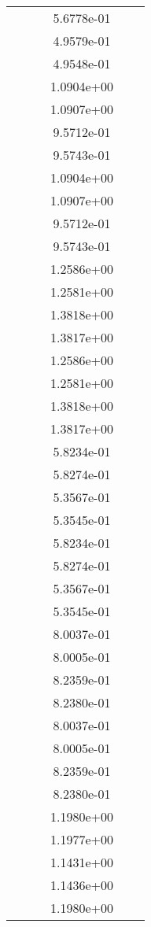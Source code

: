 \begin{xltabular}{\textwidth}{r|rS[table-format=1.3e+2]S[table-format=1.4e+2]S[table-format=1.4e+2]S[table-format=-1.5]}
&  &  & 5.6778e-01 & & \\
&  &  & 4.9579e-01 & & \\
&  &  & 4.9548e-01 & & \\
&  &  & 1.0904e+00 & & \\
&  &  & 1.0907e+00 & & \\
&  &  & 9.5712e-01 & & \\
&  &  & 9.5743e-01 & & \\
&  &  & 1.0904e+00 & & \\
&  &  & 1.0907e+00 & & \\
&  &  & 9.5712e-01 & & \\
&  &  & 9.5743e-01 & & \\
&  &  & 1.2586e+00 & & \\
&  &  & 1.2581e+00 & & \\
&  &  & 1.3818e+00 & & \\
&  &  & 1.3817e+00 & & \\
&  &  & 1.2586e+00 & & \\
&  &  & 1.2581e+00 & & \\
&  &  & 1.3818e+00 & & \\
&  &  & 1.3817e+00 & & \\
&  &  & 5.8234e-01 & & \\
&  &  & 5.8274e-01 & & \\
&  &  & 5.3567e-01 & & \\
&  &  & 5.3545e-01 & & \\
&  &  & 5.8234e-01 & & \\
&  &  & 5.8274e-01 & & \\
&  &  & 5.3567e-01 & & \\
&  &  & 5.3545e-01 & & \\
&  &  & 8.0037e-01 & & \\
&  &  & 8.0005e-01 & & \\
&  &  & 8.2359e-01 & & \\
&  &  & 8.2380e-01 & & \\
&  &  & 8.0037e-01 & & \\
&  &  & 8.0005e-01 & & \\
&  &  & 8.2359e-01 & & \\
&  &  & 8.2380e-01 & & \\
&  &  & 1.1980e+00 & & \\
&  &  & 1.1977e+00 & & \\
&  &  & 1.1431e+00 & & \\
&  &  & 1.1436e+00 & & \\
&  &  & 1.1980e+00 & & \\

\end{xltabular}
